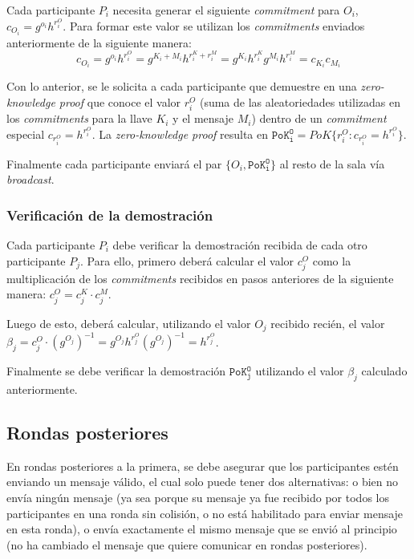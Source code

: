 Cada participante $P_i$ necesita generar el siguiente \emph{commitment} para $O_i$, $c_{O_i} = g^{o_i} h^{r_i^O}$. Para formar este valor se utilizan los \emph{commitments} enviados anteriormente de la siguiente manera: $$c_{O_i} = g^{o_i} h^{r_i^O} = g^{K_i + M_i} h^{r_i^K + r_i^M} = g^{K_i} h^{r_i^K} g^{M_i} h^{r_i^M} = c_{K_i} c_{M_i}$$

Con lo anterior, se le solicita a cada participante que demuestre en una \emph{zero-knowledge proof} que conoce el valor $r_i^O$ (suma de las aleatoriedades utilizadas en los \emph{commitments} para la llave $K_i$ y el mensaje $M_i$) dentro de un \emph{commitment} especial $c_{r_i^O} = h^{r_i^O}$. La \emph{zero-knowledge proof} resulta en $\mathtt{PoK_i^O} = PoK\{r_i^O : c_{r_i^O} = h^{r_i^O}\}$.

Finalmente cada participante enviará el par $\{O_i, \mathtt{PoK_i^O}\}$ al resto de la sala vía \emph{broadcast}.

\subsubsection{Verificación de la demostración}

Cada participante $P_i$ debe verificar la demostración recibida de cada otro participante $P_j$. Para ello, primero deberá calcular el valor $c_j^O$ como la multiplicación de los \emph{commitments} recibidos en pasos anteriores de la siguiente manera: $c_j^O = c_j^K \cdot c_j^M$.

Luego de esto, deberá calcular, utilizando el valor $O_j$ recibido recién, el valor $\beta_j = c_j^O \cdot (g^{O_j})^{-1} = g^{O_j} h^{r_j^O} (g^{O_j})^{-1} = h^{r_j^O}$.

Finalmente se debe verificar la demostración $\mathtt{PoK_j^O}$ utilizando el valor $\beta_j$ calculado anteriormente.

\subsection{Rondas posteriores}

En rondas posteriores a la primera, se debe asegurar que los participantes estén enviando un mensaje válido, el cual solo puede tener dos alternativas: o bien no envía ningún mensaje (ya sea porque su mensaje ya fue recibido por todos los participantes en una ronda sin colisión, o no está habilitado para enviar mensaje en esta ronda), o envía exactamente el mismo mensaje que se envió al principio (no ha cambiado el mensaje que quiere comunicar en rondas posteriores).

